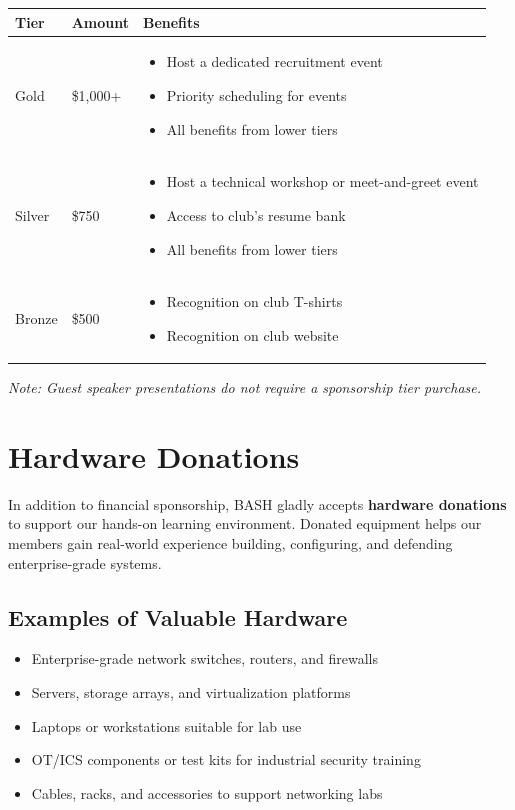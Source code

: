 \documentclass[11pt,letterpaper]{article}
\begin{document}
\begin{table}[h]
    \centering
    \begin{tabular}{p{2cm}p{3cm}p{8cm}}
        \toprule
        \textbf{Tier} & \textbf{Amount} & \textbf{Benefits} \\
        \midrule
        Gold & \$1,000+ & 
        \begin{itemize}[leftmargin=*,nosep]
            \item Host a dedicated recruitment event
            \item Priority scheduling for events
            \item All benefits from lower tiers
        \end{itemize} \\
        Silver & \$750 & 
        \begin{itemize}[leftmargin=*,nosep]
            \item Host a technical workshop or meet-and-greet event
            \item Access to club's resume bank
            \item All benefits from lower tiers
        \end{itemize} \\
        Bronze & \$500 & 
        \begin{itemize}[leftmargin=*,nosep]
            \item Recognition on club T-shirts
            \item Recognition on club website
        \end{itemize} \\
        \bottomrule
    \end{tabular}
\end{table}
\vspace{2cm}
\textit{Note: Guest speaker presentations do not require a sponsorship tier purchase.}

\section*{Hardware Donations}
In addition to financial sponsorship, BASH gladly accepts \textbf{hardware donations} to support our hands-on learning environment. Donated equipment helps our members gain real-world experience building, configuring, and defending enterprise-grade systems.

\subsection*{Examples of Valuable Hardware}
\begin{itemize}
    \item Enterprise-grade network switches, routers, and firewalls
    \item Servers, storage arrays, and virtualization platforms
    \item Laptops or workstations suitable for lab use
    \item OT/ICS components or test kits for industrial security training
    \item Cables, racks, and accessories to support networking labs
\end{itemize}
\end{document}
